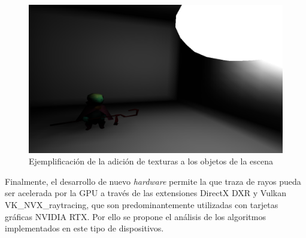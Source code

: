 \begin{figure}[H]
	\centering
	\includegraphics[width=.7\linewidth]{assets/text}
	\caption{Ejemplificación de la adición de texturas a los objetos de la escena}
	\label{img:text}
\end{figure}

Finalmente, el desarrollo de nuevo \textit{hardware} permite la que traza de rayos pueda ser acelerada por la GPU a través de las extensiones DirectX DXR y Vulkan VK\_NVX\_raytracing, que son predominantemente utilizadas con tarjetas gráficas NVIDIA RTX. Por ello se propone el análisis de los algoritmos implementados en este tipo de dispositivos.